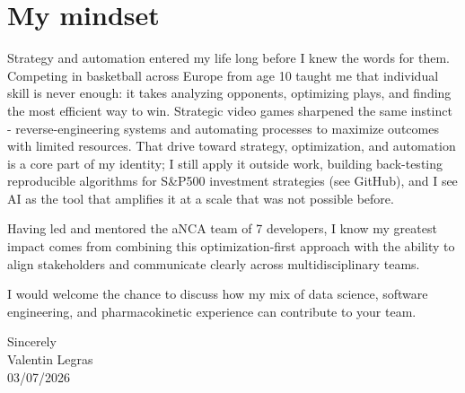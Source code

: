 \documentclass[11pt,a4paper]{article}
\newcommand{\SignDate}{03/07/2026}
\begin{document}
\section{My mindset}
Strategy and automation entered my life long before I knew the words for them.
Competing in basketball across Europe from age 10 taught me that individual skill
is never enough: it takes analyzing opponents, optimizing plays, and finding the
most efficient way to win. Strategic video games sharpened the same instinct -
reverse-engineering systems and automating processes to maximize outcomes with
limited resources. That drive toward strategy, optimization, and automation is a
core part of my identity; I still apply it outside work, building back-testing
reproducible algorithms for S\&P500 investment strategies (see GitHub), and I see
AI as the tool that amplifies it at a scale that was not possible before.

Having led and mentored the aNCA team of 7 developers, I know my greatest impact
comes from combining this optimization-first approach with the ability to align
stakeholders and communicate clearly across multidisciplinary teams.

I would welcome the chance to discuss how my mix of data science, software
engineering, and pharmacokinetic experience can contribute to your team.

\vspace{6pt}
Sincerely\\[6pt]
Valentin Legras\\
\SignDate{}
\end{document}
